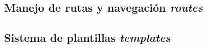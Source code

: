 \subsection{Manejo de rutas y navegación \emph{routes}}
\subsection{Sistema de plantillas \emph{templates}}




